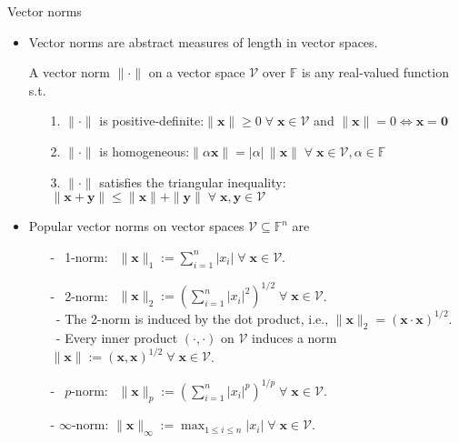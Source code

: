 \documentclass[t,usepdftitle=false]{beamer}
\begin{document}
\begin{frame}{Vector norms}
\begin{itemize}
\item Vector norms are abstract measures of length in vector spaces.
\begin{definition}
A vector norm $\|\cdot\|$ on a vector space $\mathcal{V}$ over $\mathbb{F}$ is any real-valued function s.t.\\
\begin{enumerate}
\item[1.] $\|\cdot\|$ is positive-definite:\hfill$\|\mathbf{x}\|\geq 0\;\forall\;\mathbf{x}\in \mathcal{V}$ and  $\|\mathbf{x}\|= 0\iff \mathbf{x}=\boldsymbol{0}$
\item[2.] $\|\cdot\|$ is homogeneous:\hfill$\|\alpha\mathbf{x}\|=|\alpha|\,\|\mathbf{x}\|\;\forall\;\mathbf{x}\in \mathcal{V},\alpha\in\mathbb{F}$
\item[3.] $\|\cdot\|$ satisfies the triangular inequality:\hfill$\|\mathbf{x}+\mathbf{y}\|\leq\|\mathbf{x}\|+\|\mathbf{y}\|\;\forall\;\mathbf{x},\mathbf{y}\in \mathcal{V}$
\end{enumerate}
\end{definition}
\item Popular vector norms on vector spaces $\mathcal{V}\subseteq \mathbb{F}^n$ are 
\begin{itemize}
\item[-]  $\;\,$1-norm: $\;\,\|\mathbf{x}\|_1:=\sum_{i=1}^n|x_i|\;\forall\;\mathbf{x}\in \mathcal{V}$.\smallskip
\item[-]  $\;\,$2-norm: $\;\,\|\mathbf{x}\|_2:=\left(\sum_{i=1}^n|x_i|^2\right)^{1/2}\;\forall\;\mathbf{x}\in \mathcal{V}$.\smallskip\\
$\;\,$- The 2-norm is induced by the dot product, i.e., $\|\mathbf{x}\|_2=(\mathbf{x}\cdot \mathbf{x})^{1/2}$.\smallskip\\
$\;\,$- Every inner product $(\cdot,\cdot)$ on $\mathcal{V}$ induces a norm $\|\mathbf{x}\|:=(\mathbf{x},\mathbf{x})^{1/2}\;\forall\;\mathbf{x}\in \mathcal{V}$.\smallskip
\item[-]  $\;\,p$-norm: $\;\,\|\mathbf{x}\|_p:=\left(\sum_{i=1}^n|x_i|^p\right)^{1/p}\;\forall\;\mathbf{x}\in\mathcal{V}$.\smallskip
\item[-]  $\infty$-norm: $\|\mathbf{x}\|_\infty:=\max_{1\leq i\leq n}|x_i|\;\forall\;\mathbf{x}\in \mathcal{V}$.
\end{itemize}
\end{itemize}
\end{frame}
\end{document}
